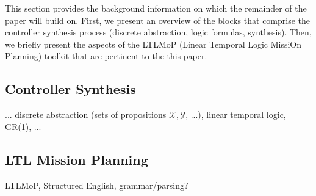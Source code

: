 This section provides the background information on which the remainder of the paper will build on. First, we present an overview of the blocks that comprise the controller synthesis process (discrete abstraction, logic formulas, synthesis). Then, we briefly present the aspects of the LTLMoP (Linear Temporal Logic MissiOn Planning) toolkit that are pertinent to the this paper.

\subsection{Controller Synthesis}

... discrete abstraction (sets of propositions $\mathcal{X}, \mathcal{Y}$, ...), linear temporal logic, GR(1), ...

\subsection{LTL Mission Planning}

LTLMoP, Structured English, grammar/parsing?